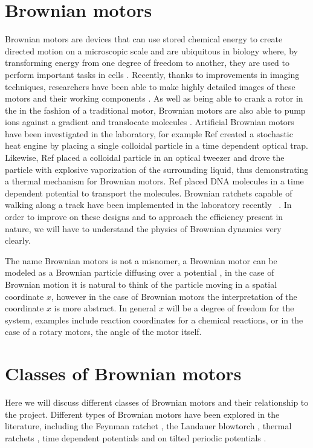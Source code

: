 \section{Brownian motors}
Brownian motors are devices that can use stored chemical energy to create directed motion on a microscopic scale and are ubiquitous in biology where, by transforming energy from one degree of freedom to another, they are used to perform important tasks in cells \cite{PhillipsQuakeMay2006, Magnasco1994,Nelson2014}. Recently, thanks to improvements in imaging techniques, researchers have been able to make highly detailed images of these motors and their working components \cite{YiWeiChang2016}. As well as being able to crank a rotor in the in the fashion of a traditional motor, Brownian motors are also able to pump ions against a gradient and translocate molecules \cite{Magnasco1994, Reimann2001, Leibler1993, leibler1990physical}. Artificial Brownian motors have been investigated in the laboratory, for example Ref \cite{BlickleBechinger2011} created a stochastic heat engine by placing a single colloidal particle in a time dependent optical trap. Likewise, Ref \cite{Pedro2014} placed a colloidal particle in an optical tweezer and drove the particle with explosive vaporization of the surrounding liquid, thus demonstrating a thermal mechanism for Brownian motors. Ref \cite{JoelBader1999} placed DNA molecules in a time dependent potential to transport the molecules. Brownian ratchets capable of walking along a track have been implemented in the laboratory recently  ~\cite{Wang2010,DeliusGeertsemaLeigh2010,DeliusGeertsemaLeighEtAl2010}. In order to improve on these designs and to approach the efficiency present in nature, we will have to understand the physics of Brownian dynamics very clearly.

The name Brownian motors is not a misnomer, a Brownian motor can be modeled as a Brownian particle diffusing over a potential \cite{Reimann2001}, in the case of Brownian motion it is natural to think of the particle moving in a spatial coordinate $x$, however in the case of Brownian motors the interpretation of the coordinate $x$ is more abstract. In general $x$ will be a degree of freedom for the system, examples include reaction coordinates for a chemical reactions, or in the case of a rotary motors, the angle of the motor itself.

\section{Classes of Brownian motors} \label{BrownianMotorClasses}
Here we will discuss different classes of Brownian motors and their relationship to the project. Different types of Brownian motors have been explored in the literature, including the Feynman ratchet \cite{Feynman1963}, the Landauer blowtorch \cite{Landauer1988}, thermal ratchets \cite{Pedro2014}, time dependent potentials \cite{JoelBader1999,BlickleBechinger2011} and on tilted periodic potentials \cite{Leibler1993,Magnasco1994}.


